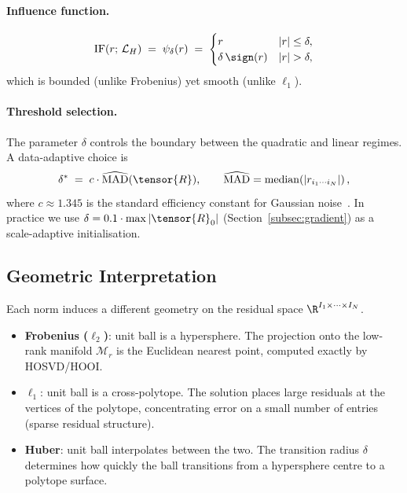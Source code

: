 \paragraph{Influence function.}
\begin{equation}
  \mathrm{IF}(r;\, \mathcal{L}_H)
  \;=\; \psi_\delta(r)
  \;=\; \begin{cases}
          r                    & |r| \leq \delta, \\
          \delta\,\sign(r) & |r| > \delta,
        \end{cases}
  \label{eq:if_huber}
\end{equation}
which is bounded (unlike Frobenius) yet smooth (unlike $\ell_1$).

\paragraph{Threshold selection.}
The parameter $\delta$ controls the boundary between the quadratic and
linear regimes.
A data-adaptive choice is
\begin{equation}
  \delta^*
  \;=\; c \cdot \widehat{\mathrm{MAD}}(\tensor{R}),
  \qquad
  \widehat{\mathrm{MAD}} = \mathrm{median}\!\left(|r_{i_1\cdots i_N}|
  \right),
  \label{eq:delta_mad}
\end{equation}
where $c \approx 1.345$ is the standard efficiency constant for
Gaussian noise~\cite{huber1964robust}.
In practice we use $\delta = 0.1 \cdot \max|\tensor{R}_0|$
(Section~\ref{subsec:gradient}) as a scale-adaptive initialisation.

\subsection{Geometric Interpretation}
\label{subsec:norm_geometry}

Each norm induces a different geometry on the residual space
$\R^{I_1 \times \cdots \times I_N}$.

\begin{itemize}
  \item \textbf{Frobenius ($\ell_2$)}: unit ball is a hypersphere.
        The projection onto the low-rank manifold $\mathcal{M}_r$ is
        the Euclidean nearest point, computed exactly by HOSVD/HOOI.

  \item \textbf{$\ell_1$}: unit ball is a cross-polytope.
        The solution places large residuals at the vertices of the
        polytope, concentrating error on a small number of entries
        (sparse residual structure).

  \item \textbf{Huber}: unit ball interpolates between the two.
        The transition radius $\delta$ determines how quickly the ball
        transitions from a hypersphere centre to a polytope surface.
\end{itemize}

